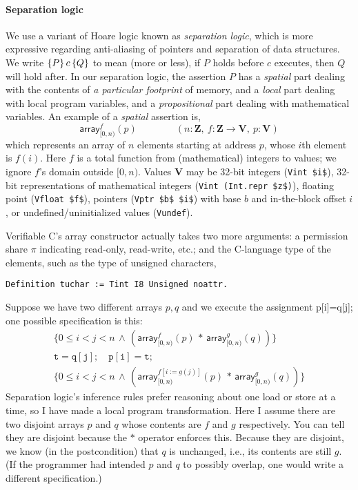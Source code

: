 \documentclass[prodmode,acmtoplas]{acmsmall}
\begin{document}
\paragraph{Separation logic}
We use a variant of  Hoare logic
known as \emph{separation logic},
which is more expressive regarding
anti-aliasing of pointers and separation
of data structures.
We write $\{P\}\,c\,\{Q\}$
to mean (more or less), if $P$ holds
before $c$ executes, then $Q$ will hold after.
In our separation logic, the assertion $P$
has a \emph{spatial} part dealing with
the contents of \emph{a particular footprint}
of memory, and a \emph{local} part dealing with
local program variables, and a \emph{propositional}
part dealing with mathematical variables.
An example of a \emph{spatial} assertion is,
\[
\mathsf{array}_{[0,n)}^f(p) 
\qquad\qquad
(n:\mathbf{Z},~f:\mathbf{Z}\rightarrow \mathbf{V},~p:\mathbf{V})
\]
which represents an array of $n$ elements starting at address $p$,
whose $i$th element is $f(i)$.  Here $f$ is a total function from
(mathematical) integers to values; we ignore $f$'s domain outside
 $[0,n)$.  Values $\mathbf{V}$ 
may be 32-bit integers (\lstinline{Vint $i$}),
32-bit representations of mathematical integers (\lstinline{Vint (Int.repr $z$)}),
floating point (\lstinline{Vfloat $f$}), pointers (\lstinline{Vptr $b$ $i$}) with base $b$
and in-the-block offset $i$, or undefined/uninitialized values 
(\lstinline{Vundef}).

Verifiable C's array constructor actually takes two more arguments:
a permission share $\pi$ indicating read-only, read-write, etc.; 
and the C-language type of the elements, such as the type of
unsigned characters,
\begin{lstlisting}
Definition tuchar := Tint I8 Unsigned noattr.
\end{lstlisting}

Suppose we have two different arrays $p,q$ and we execute
the assignment \textsf{p[i]=q[j];} one possible
specification is this:
\[
\begin{array}{l}
\{ 0\le i < j < n \,\wedge\,(\mathsf{array}_{[0,n)}^f(p)\,*\,\mathsf{array}_{[0,n)}^g(q)) \} \\
\mathtt{t=q[j]; \quad p[i]=t;} \\
\{ 0\le i < j < n \,\wedge\,(\mathsf{array}_{[0,n)}^{f[i:=g(j)]}(p)\,*\,\mathsf{array}_{[0,n)}^g(q)) \}
\end{array}
\]
Separation logic's inference rules prefer reasoning about
one load or store at a time, so I have made a local program
transformation.
Here I assume there are two disjoint arrays $p$ and $q$ 
whose contents are $f$ and $g$ respectively.  You can tell they are
disjoint because the $*$ operator enforces this.
Because they are disjoint, we know (in the postcondition) that
$q$ is unchanged, i.e., its contents are still $g$.
(If the programmer had intended $p$ and $q$ to possibly overlap,
one would write a different specification.)
\end{document}
